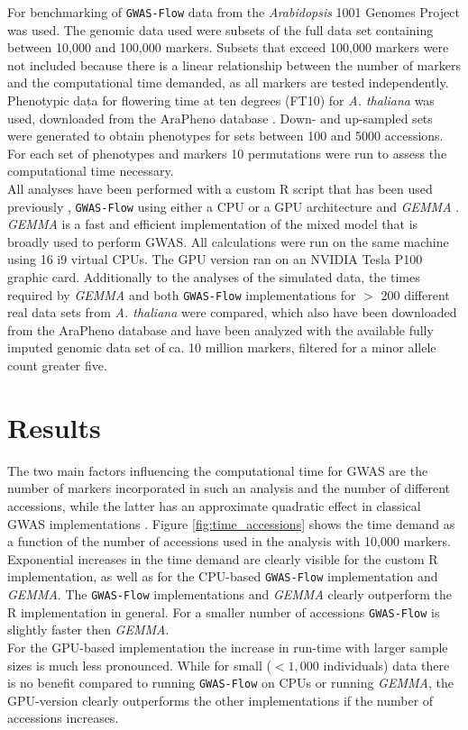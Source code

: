 For benchmarking of \texttt{GWAS-Flow} data from the \textit{Arabidopsis} 1001 Genomes
Project \cite{1001genome} was used. The genomic data used were subsets of the full data
set containing between 10,000 and 100,000 markers. Subsets that exceed 100,000 markers
were not included because there is a linear relationship between the number of markers and
the computational time demanded, as all markers are tested independently. Phenotypic data
for flowering time at ten degrees (FT10) for \textit{A. thaliana} was used, downloaded
from the AraPheno database \cite{seren2016arapheno}. Down- and up-sampled sets were
generated to obtain phenotypes for sets between 100 and 5000 accessions. For each set of
phenotypes and markers 10 permutations were run to assess the computational time
necessary.\\
All analyses have been performed with a custom R script that has been used previously
\cite{togninalli2017aragwas}, \texttt{GWAS-Flow} using either a CPU or a GPU architecture
and \textit{GEMMA} \cite{Zhou2012}. \textit{GEMMA} is a fast and efficient implementation
of the mixed model that is broadly used to perform GWAS. All calculations were run on the
same machine using 16 i9 virtual CPUs. The GPU version ran on an NVIDIA Tesla P100 graphic
card. Additionally to the analyses of the simulated data, the times required by
\textit{GEMMA} and both \texttt{GWAS-Flow} implementations for $>$ 200 different real
data sets from \textit{A. thaliana} were compared, which also have been downloaded from the
AraPheno database \cite{seren2016arapheno} and have been analyzed with the available fully
imputed genomic data set of ca. 10 million markers, filtered for a minor allele count
greater five.

\section{Results}

The two main factors influencing the computational time for GWAS are the number of markers
incorporated in such an analysis and the number of different accessions, while the latter
has an approximate quadratic effect in classical GWAS implementations
\cite{Zhou2012}. Figure \ref{fig:time_accessions} shows the time demand as a function of
the number of accessions used in the analysis with 10,000 markers. Exponential increases
in the time demand are clearly visible for the custom R implementation, as well as for the
CPU-based \texttt{GWAS-Flow} implementation and \textit{GEMMA}. The \texttt{GWAS-Flow}
implementations and \textit{GEMMA} clearly outperform the R implementation in general.
For a smaller number of accessions \texttt{GWAS-Flow} is slightly faster then
\textit{GEMMA}.\\
For the GPU-based implementation the increase in run-time with larger sample sizes is much
less pronounced. While for small ($< 1,000$ individuals) data there is no benefit
compared to running \texttt{GWAS-Flow} on CPUs or running \textit{GEMMA}, the GPU-version
clearly outperforms the other implementations if the number of accessions increases.

